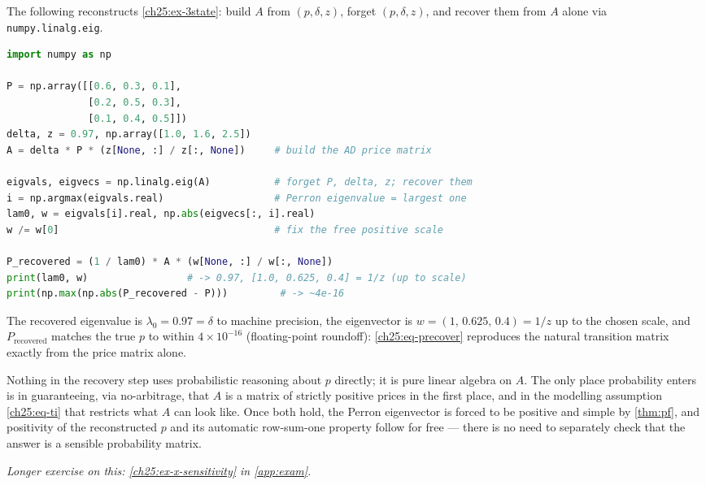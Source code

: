 \begin{paracol}{2}
\begin{casestudy}
The following reconstructs \cref{ch25:ex-3state}: build $A$ from $(p,\delta,z)$, forget $(p,\delta,z)$, and
recover them from $A$ alone via \texttt{numpy.linalg.eig}.
\begin{lstlisting}[language=Python]
import numpy as np

P = np.array([[0.6, 0.3, 0.1],
              [0.2, 0.5, 0.3],
              [0.1, 0.4, 0.5]])
delta, z = 0.97, np.array([1.0, 1.6, 2.5])
A = delta * P * (z[None, :] / z[:, None])     # build the AD price matrix

eigvals, eigvecs = np.linalg.eig(A)           # forget P, delta, z; recover them
i = np.argmax(eigvals.real)                   # Perron eigenvalue = largest one
lam0, w = eigvals[i].real, np.abs(eigvecs[:, i].real)
w /= w[0]                                     # fix the free positive scale

P_recovered = (1 / lam0) * A * (w[None, :] / w[:, None])
print(lam0, w)                 # -> 0.97, [1.0, 0.625, 0.4] = 1/z (up to scale)
print(np.max(np.abs(P_recovered - P)))         # -> ~4e-16
\end{lstlisting}
The recovered eigenvalue is $\lambda_0=0.97=\delta$ to machine precision, the eigenvector is
$w=(1,\,0.625,\,0.4)=1/z$ up to the chosen scale, and $P_{\mathrm{recovered}}$ matches the true $p$ to
within $4\times10^{-16}$ (floating-point roundoff): \cref{ch25:eq-precover} reproduces the natural
transition matrix exactly from the price matrix alone.
\end{casestudy}

\begin{intuition}
Nothing in the recovery step uses probabilistic reasoning about $p$ directly; it is pure linear algebra on
$A$. The only place probability enters is in guaranteeing, via no-arbitrage, that $A$ is a matrix of
strictly positive prices in the first place, and in the modelling assumption \eqref{ch25:eq-ti} that
restricts what $A$ can look like. Once both hold, the Perron eigenvector is forced to be positive and simple
by \cref{thm:pf}, and positivity of the reconstructed $p$ and its automatic row-sum-one property follow for
free --- there is no need to separately check that the answer is a sensible probability matrix.
\end{intuition}

\noindent\emph{Longer exercise on this: \cref{ch25:ex-x-sensitivity} in \cref{app:exam}.}


\end{paracol}
